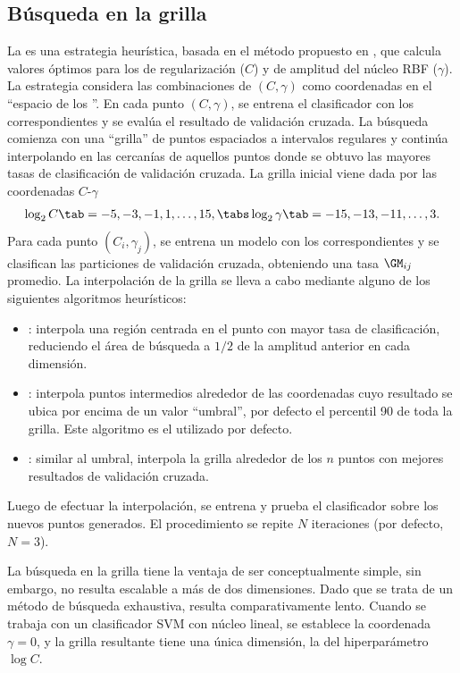 %
%
\subsection{Búsqueda en la grilla}
%
La  es una estrategia heurística, basada en el
método propuesto en \cite{hsu}, que calcula valores óptimos para los
 de regularización ($C$) y de amplitud del núcleo RBF
($\gamma$).
La estrategia considera las combinaciones de $(C,\gamma)$ como
coordenadas en el ``espacio de los ''.
En cada punto $(C,\gamma)$, se entrena el clasificador con los
 correspondientes y se evalúa el resultado de validación
cruzada.
La búsqueda comienza con una ``grilla'' de puntos espaciados a
intervalos regulares y continúa interpolando en las cercanías de
aquellos puntos donde se obtuvo las mayores tasas de clasificación de
validación cruzada.
La grilla inicial viene dada por las coordenadas $C$-$\gamma$
%
\begin{align}
  \label{initial-grid}
  \log_2 C     \tab= -5, -3, -1, 1, \ldots, 15, \tabs
  \log_2\gamma \tab= -15,-13, -11, \ldots, 3.
\end{align}
%
Para cada punto $(C_i,\gamma_j)$, se entrena un modelo con los
 correspondientes y se clasifican las particiones de
validación cruzada, obteniendo una tasa ${\GM}_{ij}$ promedio.
La interpolación de la grilla se lleva a cabo mediante alguno de los
siguientes algoritmos heurísticos:
%
\begin{itemize}
\item
  : interpola una región centrada en el punto con mayor tasa
  de clasificación, reduciendo el área de búsqueda a $1/2$ de la
  amplitud anterior en cada dimensión.
\item
  : interpola puntos intermedios alrededor de las
  coordenadas cuyo resultado se ubica por encima de un valor
  ``umbral'', por defecto el percentil 90 de toda la grilla.
  Este algoritmo es el utilizado por defecto.
\item
  : similar al umbral, interpola la grilla alrededor de
  los $n$ puntos con mejores resultados de validación cruzada.
\end{itemize}
%
Luego de efectuar la interpolación, se entrena y prueba el
clasificador sobre los nuevos puntos generados.
El procedimiento se repite $N$ iteraciones (por defecto, $N=3$).

La búsqueda en la grilla tiene la ventaja de ser conceptualmente
simple, sin embargo, no resulta escalable a más de dos dimensiones.
Dado que se trata de un método de búsqueda exhaustiva, resulta
comparativamente lento.
Cuando se trabaja con un clasificador SVM con núcleo lineal, se
establece la coordenada $\gamma=0$, y la grilla resultante tiene una
única dimensión, la del hiperparámetro $\log C$.
